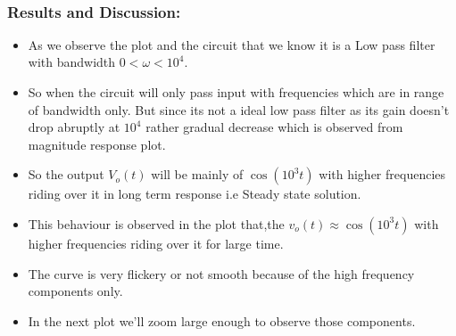 \documentclass[11pt]{article}
\providecommand{\tightlist}{%
      \setlength{\itemsep}{0pt}\setlength{\parskip}{0pt}}
\begin{document}
    \begin{center}
    \end{center}
    { \hspace*{\fill} \\}
    
    \subsubsection{Results and Discussion:}\label{results-and-discussion}

\begin{itemize}
\tightlist
\item
  As we observe the plot and the circuit that we know it is a Low pass
  filter with bandwidth \(0< \omega < 10^4\).
\item
  So when the circuit will only pass input with frequencies which are in
  range of bandwidth only. But since its not a ideal low pass filter as
  its gain doesn't drop abruptly at \(10^4\) rather gradual decrease
  which is observed from magnitude response plot.
\item
  So the output \(V_o(t)\) will be mainly of \(\cos(10^{3}t)\) with
  higher frequencies riding over it in long term response i.e Steady
  state solution.
\item
  This behaviour is observed in the plot that,the
  \(v_o(t) \approx \cos(10^{3}t)\) with higher frequencies riding over
  it for large time.
\item
  The curve is very flickery or not smooth because of the high frequency
  components only.
\item
  In the next plot we'll zoom large enough to observe those components.
\end{itemize}
\end{document}
